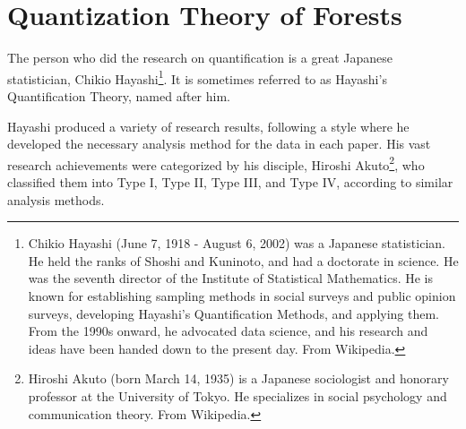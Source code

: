 \documentclass{ltjsbook}
\begin{document}
\section{Quantization Theory of Forests}
The person who did the research on quantification is a great Japanese statistician, Chikio Hayashi\footnote{Chikio Hayashi (June 7, 1918 - August 6, 2002) was a Japanese statistician. He held the ranks of Shoshi and Kuninoto, and had a doctorate in science. He was the seventh director of the Institute of Statistical Mathematics. He is known for establishing sampling methods in social surveys and public opinion surveys, developing Hayashi's Quantification Methods, and applying them. From the 1990s onward, he advocated data science, and his research and ideas have been handed down to the present day. From Wikipedia.}. It is sometimes referred to as Hayashi's Quantification Theory, named after him.

Hayashi produced a variety of research results, following a style where he developed the necessary analysis method for the data in each paper. His vast research achievements were categorized by his disciple, Hiroshi Akuto\footnote{Hiroshi Akuto (born March 14, 1935) is a Japanese sociologist and honorary professor at the University of Tokyo. He specializes in social psychology and communication theory. From Wikipedia.}, who classified them into Type I, Type II, Type III, and Type IV, according to similar analysis methods.


\end{document}
